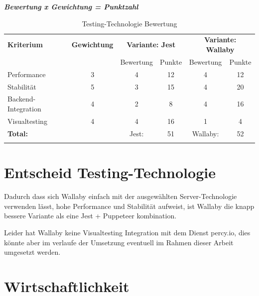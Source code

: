 \textbf{\textit{Bewertung x Gewichtung = Punktzahl}}

\begin{longtable}[]{@{}p{2cm}ccccc@{}}
  \toprule
  \textbf{Kriterium}  & \textbf{Gewichtung} & \multicolumn{2}{c}{\textbf{Variante: Jest}} & \multicolumn{2}{c}{\textbf{Variante: Wallaby}}\tabularnewline
                      &                     & Bewertung                                   & Punkte                                                        & Bewertung & Punkte\tabularnewline
  \midrule
  \endhead
  Performance         & 3                   & 4                                           & 12                                                            & 4         & 12\tabularnewline
  Stabilität          & 5                   & 3                                           & 15                                                            & 4         & 20\tabularnewline
  Backend-Integration & 4                   & 2                                           & 8                                                             & 4         & 16\tabularnewline
  Visualtesting       & 4                   & 4                                           & 16                                                            & 1         & 4\tabularnewline
  \midrule
  \textbf{Total:}     &                     & Jest:                                       & 51                                                            & Wallaby:  & 52\tabularnewline
  \bottomrule
  \caption{Testing-Technologie Bewertung}
\end{longtable}

\section{Entscheid Testing-Technologie}\label{entscheid-testing-technologie}

Dadurch dass sich Wallaby einfach mit der ausgewählten Server-Technologie
verwenden lässt, hohe Performance und Stabilität aufweist, ist Wallaby die
knapp bessere Variante als eine Jest + Puppeteer kombination.

Leider hat Wallaby keine Visualtesting Integration mit dem Dienst percy.io,
dies könnte aber im verlaufe der Umsetzung eventuell im Rahmen dieser Arbeit
umgesetzt werden.

\clearpage
\section{Wirtschaftlichkeit}\label{wirtschaftlichkeit}

